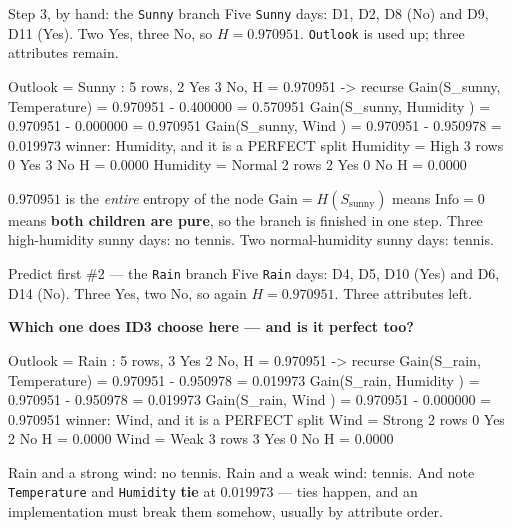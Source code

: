 \documentclass[aspectratio=169]{beamer}
\begin{document}
\begin{frame}[fragile,shrink=8]{Step 3, by hand: the \texttt{Sunny} branch}
Five \texttt{Sunny} days: D1, D2, D8 (No) and D9, D11 (Yes). Two Yes, three
No, so $H = 0.970951$. \texttt{Outlook} is used up; three attributes remain.
\begin{outblk}
Outlook = Sunny    : 5 rows, 2 Yes 3 No, H = 0.970951  -> recurse
   Gain(S_sunny, Temperature) = 0.970951 - 0.400000 = 0.570951
   Gain(S_sunny, Humidity   ) = 0.970951 - 0.000000 = 0.970951
   Gain(S_sunny, Wind       ) = 0.970951 - 0.950978 = 0.019973
   winner: Humidity, and it is a PERFECT split
      Humidity = High    3 rows  0 Yes 3 No   H = 0.0000
      Humidity = Normal  2 rows  2 Yes 0 No   H = 0.0000
\end{outblk}
\begin{alertblock}{$0.970951$ is the \emph{entire} entropy of the node}
  \footnotesize $\mathrm{Gain} = H(S_{\text{sunny}})$ means
  $\mathrm{Info} = 0$ means \textbf{both children are pure}, so the branch is
  finished in one step. Three high-humidity sunny days: no tennis. Two
  normal-humidity sunny days: tennis.
\end{alertblock}
\end{frame}

\begin{frame}[fragile,shrink=8]{Predict first \#2 --- the \texttt{Rain} branch}
Five \texttt{Rain} days: D4, D5, D10 (Yes) and D6, D14 (No). Three Yes, two
No, so again $H = 0.970951$. Three attributes left.
\begin{center}
  \textbf{Which one does ID3 choose here --- and is it perfect too?}
\end{center}
\vspace{0.2em}
\begin{outblk}
Outlook = Rain     : 5 rows, 3 Yes 2 No, H = 0.970951  -> recurse
   Gain(S_rain, Temperature) = 0.970951 - 0.950978 = 0.019973
   Gain(S_rain, Humidity   ) = 0.970951 - 0.950978 = 0.019973
   Gain(S_rain, Wind       ) = 0.970951 - 0.000000 = 0.970951
   winner: Wind, and it is a PERFECT split
      Wind = Strong  2 rows  0 Yes 2 No   H = 0.0000
      Wind = Weak    3 rows  3 Yes 0 No   H = 0.0000
\end{outblk}
\begin{center}\small
  Rain and a strong wind: no tennis. Rain and a weak wind: tennis. And note
  \texttt{Temperature} and \texttt{Humidity} \textbf{tie} at $0.019973$ ---
  ties happen, and an implementation must break them somehow, usually by
  attribute order.
\end{center}
\end{frame}
\end{document}
